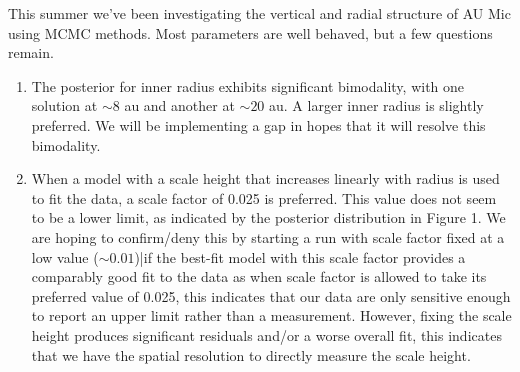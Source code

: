 \documentclass[12pt,modern]{article}
\begin{document}
This summer we've been investigating the vertical and radial structure of AU Mic using MCMC methods. 
Most parameters are well behaved, but a few questions remain.
\begin{enumerate}
  \item The posterior for inner radius exhibits significant bimodality, with one solution at $\sim 8$ au and another at $\sim 20$ au. 
  A larger inner radius is slightly preferred.
  We will be implementing a gap in hopes that it will resolve this bimodality.
  \item When a model with a scale height that increases linearly with radius is used to fit the data, a scale factor of 0.025 is preferred. This value does not seem to be a lower limit, as indicated by the posterior distribution in Figure 1. We are hoping to confirm/deny this by starting a run with scale factor fixed at a low value ($\sim 0.01$)|if the best-fit model with this scale factor provides a comparably good fit to the data as when scale factor is allowed to take its preferred value of 0.025, this indicates that our data are only sensitive enough to report an upper limit rather than a measurement. However, fixing the scale height produces significant residuals and/or a worse overall fit, this indicates that we have the spatial resolution to directly measure the scale height.
\end{enumerate}
\end{document}
